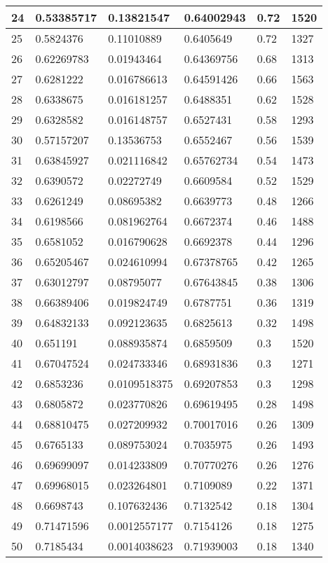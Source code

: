 \begin{longtable}{|l|l|l|l|l|l|}
24 & 0.53385717 & 0.13821547 & 0.64002943 & 0.72 & 1520 \\ \hline 
25 & 0.5824376 & 0.11010889 & 0.6405649 & 0.72 & 1327 \\ \hline 
26 & 0.62269783 & 0.01943464 & 0.64369756 & 0.68 & 1313 \\ \hline 
27 & 0.6281222 & 0.016786613 & 0.64591426 & 0.66 & 1563 \\ \hline 
28 & 0.6338675 & 0.016181257 & 0.6488351 & 0.62 & 1528 \\ \hline 
29 & 0.6328582 & 0.016148757 & 0.6527431 & 0.58 & 1293 \\ \hline 
30 & 0.57157207 & 0.13536753 & 0.6552467 & 0.56 & 1539 \\ \hline 
31 & 0.63845927 & 0.021116842 & 0.65762734 & 0.54 & 1473 \\ \hline 
32 & 0.6390572 & 0.02272749 & 0.6609584 & 0.52 & 1529 \\ \hline 
33 & 0.6261249 & 0.08695382 & 0.6639773 & 0.48 & 1266 \\ \hline 
34 & 0.6198566 & 0.081962764 & 0.6672374 & 0.46 & 1488 \\ \hline 
35 & 0.6581052 & 0.016790628 & 0.6692378 & 0.44 & 1296 \\ \hline 
36 & 0.65205467 & 0.024610994 & 0.67378765 & 0.42 & 1265 \\ \hline 
37 & 0.63012797 & 0.08795077 & 0.67643845 & 0.38 & 1306 \\ \hline 
38 & 0.66389406 & 0.019824749 & 0.6787751 & 0.36 & 1319 \\ \hline 
39 & 0.64832133 & 0.092123635 & 0.6825613 & 0.32 & 1498 \\ \hline 
40 & 0.651191 & 0.088935874 & 0.6859509 & 0.3 & 1520 \\ \hline 
41 & 0.67047524 & 0.024733346 & 0.68931836 & 0.3 & 1271 \\ \hline 
42 & 0.6853236 & 0.0109518375 & 0.69207853 & 0.3 & 1298 \\ \hline 
43 & 0.6805872 & 0.023770826 & 0.69619495 & 0.28 & 1498 \\ \hline 
44 & 0.68810475 & 0.027209932 & 0.70017016 & 0.26 & 1309 \\ \hline 
45 & 0.6765133 & 0.089753024 & 0.7035975 & 0.26 & 1493 \\ \hline 
46 & 0.69699097 & 0.014233809 & 0.70770276 & 0.26 & 1276 \\ \hline 
47 & 0.69968015 & 0.023264801 & 0.7109089 & 0.22 & 1371 \\ \hline 
48 & 0.6698743 & 0.107632436 & 0.7132542 & 0.18 & 1304 \\ \hline 
49 & 0.71471596 & 0.0012557177 & 0.7154126 & 0.18 & 1275 \\ \hline 
50 & 0.7185434 & 0.0014038623 & 0.71939003 & 0.18 & 1340 \\ \hline 
\end{longtable}